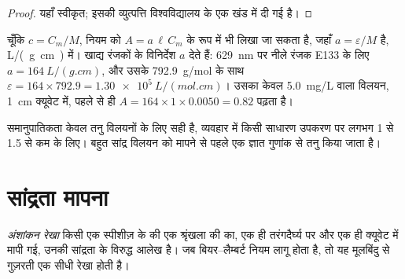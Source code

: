 \begin{proof}
यहाँ स्वीकृत; इसकी व्युत्पत्ति विश्वविद्यालय के एक खंड में दी गई है।
\end{proof}


\begin{remark}[द्रव्यमान सांद्रता के साथ]\label{rem:g11:absorbance:mass}
चूँकि $c = C_m / M$, नियम को $A = a\, \ell\, C_m$ के रूप में भी लिखा जा सकता है,
जहाँ $a = \varepsilon / M$ है, \si{L/(g.cm)} में। खाद्य रंजकों के विनिर्देश
$a$ देते हैं: \qty{629}{nm} पर नीले रंजक E133 के लिए $a =
\qty{164}{L/(g.cm)}$, और उसके  \qty{792.9}{g/mol} के साथ
$\varepsilon = 164 \times 792.9 = \qty{1.30e5}{L/(mol.cm)}$। उसका केवल
\qty{5.0}{mg/L} वाला विलयन, \qty{1}{cm} क्यूवेट में, पहले से ही
$A = 164 \times 1 \times 0.0050 = 0.82$ पढ़ता है।
\end{remark}

\begin{remark}[केवल तनु विलयन]\label{rem:g11:absorbance:dilute}
समानुपातिकता केवल तनु विलयनों के लिए सही है, व्यवहार में किसी साधारण उपकरण पर लगभग
1 से 1.5 से कम  के लिए। बहुत सांद्र विलयन को मापने से पहले एक ज्ञात
गुणांक से तनु किया जाता है।
\end{remark}

\section{सांद्रता मापना}

\begin{definition}[अंशांकन रेखा]\label{def:g11:absorbance:calibration-line}
\emph{अंशांकन रेखा} किसी एक स्पीशीज़ के  की
एक श्रृंखला की  का, एक ही तरंगदैर्घ्य पर और एक ही क्यूवेट में मापी गई,
उनकी सांद्रता के विरुद्ध आलेख है। जब
बियर--लैम्बर्ट नियम लागू होता है, तो यह मूलबिंदु से गुज़रती एक सीधी रेखा होती है।
\end{definition}

